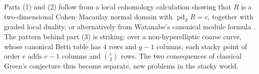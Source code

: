 \documentclass[11pt,reqno]{amsart}
\newtheorem{theorem}[lemma]{Theorem}
\theoremstyle{remark}
\newcommand{\pd}{\operatorname{pd}}
\newcommand{\cO}{\mathcal{O}}
\newcommand{\cW}{\mathcal{W}}
\newcommand{\cX}{\mathcal{X}}
\begin{document}

Parts (1) and (2) follow from a local cohomology calculation showing that $R$ is a two-dimensional Cohen--Macaulay normal domain with $\pd_SR=c$, together with graded local duality, or alternatively from Watanabe's canonical module formula \cite{watanabe81}. The pattern behind part (3) is striking: over a non-hyperelliptic coarse curve, whose canonical Betti table has $4$ rows and $g-1$ columns, each stacky point of order $e$ adds $e-1$ columns and $\binom{e}{2}$ rows. The two consequences of classical Green's conjecture thus become separate, new problems in the stacky world.
%
%
%
%
%
\end{document}

